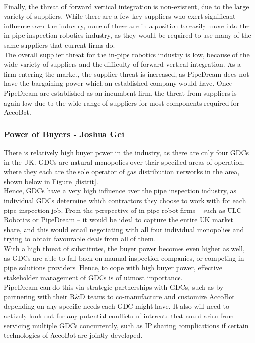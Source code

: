 \documentclass[11pt]{article}		%
\newcommand{\figref}[1]{\hyperref[#1]{Figure \ref*{#1}}}    %
\begin{document}
				\\
                \hspace*{2ex}Finally, the threat of forward vertical integration is non-existent, due to the large variety of suppliers.
				While there are a few key suppliers who exert significant influence over the industry, none of these are in a position to easily move into the in-pipe inspection robotics industry, as they would be required to use many of the same suppliers that current firms do.
				\\
                \hspace*{2ex}The overall supplier threat for the in-pipe robotics industry is low, because of the wide variety of suppliers and the difficulty of forward vertical integration.
				As a firm entering the market, the supplier threat is increased, as PipeDream does not have the bargaining power which an established company would have.
				Once PipeDream are established as an incumbent firm, the threat from suppliers is again low due to the wide range of suppliers for most components required for AccoBot.
				
		    \subsubsection{Power of Buyers - Joshua Gei}
			
    			There is relatively high buyer power in the industry, as there are only four GDCs in the UK. GDCs are natural monopolies over their specified areas of operation, where they each are the sole operator of gas distribution networks in the area, shown below in \figref{distrit}.
                \\
                \hspace*{2ex}Hence, GDCs have a very high influence over the pipe inspection industry, as individual GDCs determine which contractors they choose to work with for each pipe inspection job. From the perspective of in-pipe robot firms – such as ULC Robotics or PipeDream – it would be ideal to capture the entire UK market share, and this would entail negotiating with all four individual monopolies and trying to obtain favourable deals from all of them. 
                \\
                \hspace*{2ex}With a high threat of substitutes, the buyer power becomes even higher as well, as GDCs are able to fall back on manual inspection companies, or competing in-pipe solutions providers. Hence, to cope with high buyer power, effective stakeholder management of GDCs is of utmost importance.
                \\
                \hspace*{2ex}PipeDream can do this via strategic  partnerships with GDCs, such as by partnering with their R\&D teams to co-manufacture and customize AccoBot depending on any specific needs each GDC might have. It also will need to actively look out for any potential conflicts of interests that could arise from servicing multiple GDCs concurrently, such as IP sharing complications if certain technologies of AccoBot are jointly developed. 
				
\end{document}
